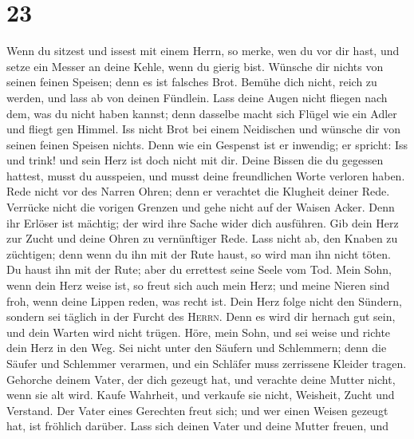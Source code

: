\hypertarget{section-22}{%
\section{23}\label{section-22}}

 Wenn du sitzest und issest mit einem Herrn, so merke, wen
du vor dir hast,  und setze ein Messer an deine Kehle,
wenn du gierig bist.  Wünsche dir nichts von seinen feinen
Speisen; denn es ist falsches Brot.  Bemühe dich nicht,
reich zu werden, und lass ab von deinen Fündlein.  Lass
deine Augen nicht fliegen nach dem, was du nicht haben kannst; denn
dasselbe macht sich Flügel wie ein Adler und fliegt gen Himmel.
 Iss nicht Brot bei einem Neidischen und wünsche dir von
seinen feinen Speisen nichts.  Denn wie ein Gespenst ist
er inwendig; er spricht: Iss und trink! und sein Herz ist doch nicht mit
dir.  Deine Bissen die du gegessen hattest, musst du
ausspeien, und musst deine freundlichen Worte verloren haben.
 Rede nicht vor des Narren Ohren; denn er verachtet die
Klugheit deiner Rede.  Verrücke nicht die vorigen Grenzen
und gehe nicht auf der Waisen Acker.  Denn ihr Erlöser
ist mächtig; der wird ihre Sache wider dich ausführen. 
Gib dein Herz zur Zucht und deine Ohren zu vernünftiger Rede.
 Lass nicht ab, den Knaben zu züchtigen; denn wenn du ihn
mit der Rute haust, so wird man ihn nicht töten.  Du
haust ihn mit der Rute; aber du errettest seine Seele vom Tod.
 Mein Sohn, wenn dein Herz weise ist, so freut sich auch
mein Herz;  und meine Nieren sind froh, wenn deine Lippen
reden, was recht ist.  Dein Herz folge nicht den Sündern,
sondern sei täglich in der Furcht des \textsc{Herrn}. 
Denn es wird dir hernach gut sein, und dein Warten wird nicht trügen.
 Höre, mein Sohn, und sei weise und richte dein Herz in
den Weg.  Sei nicht unter den Säufern und Schlemmern;
 denn die Säufer und Schlemmer verarmen, und ein Schläfer
muss zerrissene Kleider tragen.  Gehorche deinem Vater,
der dich gezeugt hat, und verachte deine Mutter nicht, wenn sie alt
wird.  Kaufe Wahrheit, und verkaufe sie nicht, Weisheit,
Zucht und Verstand.  Der Vater eines Gerechten freut
sich; und wer einen Weisen gezeugt hat, ist fröhlich darüber.
 Lass sich deinen Vater und deine Mutter freuen, und

